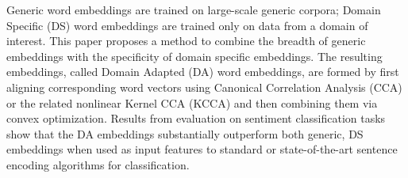 Generic word embeddings are trained on large-scale generic corpora; Domain Specific (DS) word embeddings are trained only on data from a domain of interest. This paper proposes a method to combine the breadth of generic embeddings with the specificity of domain specific embeddings. The resulting embeddings, called Domain Adapted (DA) word embeddings, are formed by first aligning corresponding word vectors using Canonical Correlation Analysis (CCA) or the related nonlinear Kernel CCA (KCCA) and then combining them via convex optimization. Results from evaluation on sentiment classification tasks show that the DA embeddings substantially outperform both generic, DS embeddings when used as input features to standard or state-of-the-art sentence encoding algorithms for classification.
